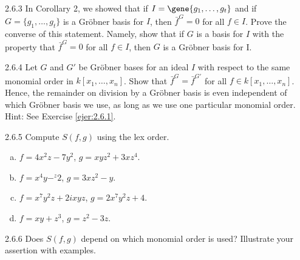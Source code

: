 \documentclass[twoside]{article}
\begin{document}
\begin{ejercicio}{2.6.3}
In Corollary 2, we showed that if $I =\gene{ 
g_1,\dots , g_t}$ and if $G = \{g_1,\dots , g_t\}$ is a Gröbner
basis for $I$, then $\bar{f}^G = 0$ for all $f ∈ I$. Prove the converse of this statement. Namely, show
that if $G$ is a basis for $I$ with the property that $\bar{f}^G = 0$ for all $f ∈ I$, then $G$ is a Gröbner
basis for I.

\end{ejercicio}
\begin{solucion}

\end{solucion}

\newpage

\begin{ejercicio}{2.6.4}
Let $G$ and $G'$ be Gröbner bases for an ideal $I$ with respect to the same monomial order
in $k[x_1,\dots , x_n]$. Show that $\bar{f}^G = \bar{f}^{G'}$
for all $f ∈ k[x_1,\dots , x_n]$. Hence, the remainder on
division by a Gröbner basis is even independent of which Gröbner basis we use, as long
as we use one particular monomial order. Hint: See Exercise \ref{ejer:2.6.1}.
\end{ejercicio}
\begin{solucion}

\end{solucion}
\newpage

\begin{ejercicio}{2.6.5}
Compute $S( f , g)$ using the lex order.
\begin{enumerate}[a.]
\item $f = 4x^2z − 7y^2$, $g = xyz^2 + 3xz^4$.
\item $f = x^4y − ^z2$, $g = 3xz^2 − y$.
\item $f = x^7y^2z + 2ixyz$, $g = 2x^7y^2z + 4$.
\item $f = xy + z^3$, $g = z^2 − 3z$.
\end{enumerate}
\end{ejercicio}
\begin{solucion}

\end{solucion}

\newpage

\begin{ejercicio}{2.6.6}
Does $S( f , g)$ depend on which monomial order is used? Illustrate your assertion with
examples.
\end{ejercicio}
\begin{solucion}

\end{solucion}
\end{document}
